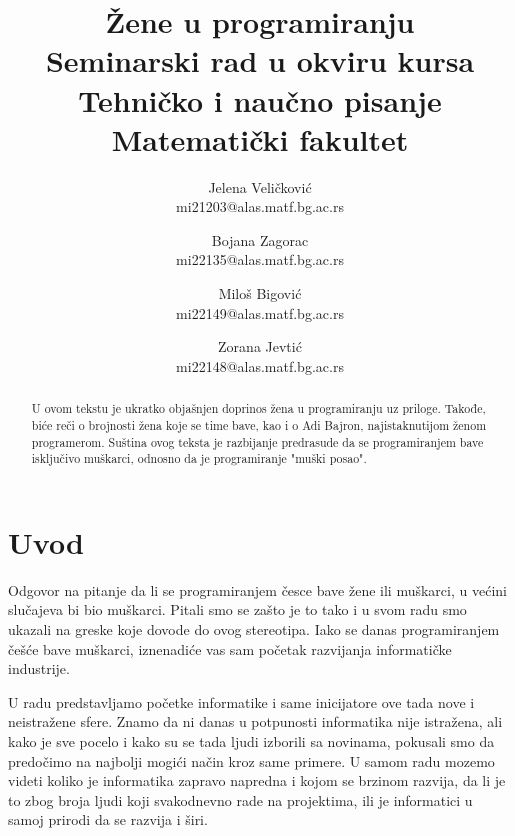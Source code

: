 \documentclass[a4paper,12pt]{article}
\begin{document}
\title{\textbf{Žene u programiranju\\} \small{Seminarski rad u okviru kursa\\Tehničko i naučno pisanje\\ Matematički fakultet}}

\author{Jelena Veličković\\ mi21203@alas.matf.bg.ac.rs \and Bojana Zagorac\\ mi22135@alas.matf.bg.ac.rs \and Miloš Bigović\\ mi22149@alas.matf.bg.ac.rs \and Zorana Jevtić\\ mi22148@alas.matf.bg.ac.rs}

\date{\textit{}}

\maketitle

\begin{abstract}
    U ovom tekstu je ukratko objašnjen doprinos žena u programiranju uz priloge. Takođe, biće reči o
    brojnosti žena koje se time bave, kao i o Adi Bajron, najistaknutijom ženom programerom. Suština 
    ovog teksta je razbijanje predrasude da se programiranjem bave isključivo muškarci, odnosno da je 
    programiranje "muški posao". 
\end{abstract}


\color{blue}\tableofcontents

\newpage
\color{black}\section{Uvod}
\begin{flushleft}
Odgovor na pitanje da li se programiranjem česce bave žene ili muškarci, u većini slučajeva bi bio muškarci. Pitali smo se zašto je to tako i u svom radu smo ukazali na greske koje dovode do ovog stereotipa. 
Iako se danas programiranjem češće bave muškarci, iznenadiće vas sam početak razvijanja informatičke industrije. 

U radu predstavljamo početke informatike i same inicijatore ove tada nove i neistražene sfere. Znamo da ni danas u potpunosti informatika nije istražena, ali kako je sve pocelo i kako su se tada ljudi izborili sa novinama, pokusali smo da predočimo na najbolji mogići način kroz same primere. U samom radu mozemo videti koliko je informatika zapravo napredna i kojom se brzinom razvija, da li je to zbog broja ljudi koji svakodnevno rade na projektima, ili je informatici u samoj prirodi da se razvija i širi.
\end{flushleft}
\end{document}
